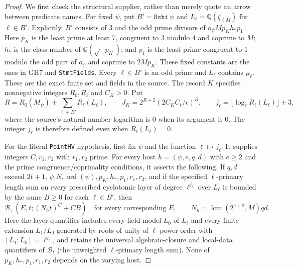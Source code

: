 \begin{proof}
We first check the structural supplier, rather than merely quote an
arrow between predicate names.  For fixed $\psi$, put
$B'=\mathtt{Bchi}\,\psi$ and
$L_\ell=\mathbb Q(\zeta_{\ell M})$ for $\ell\in B'$.
Explicitly, $B'$ consists of $3$ and the odd prime divisors of
$o_\psi M p_Kh_*p_1$.  Here $p_K$ is the least prime at least $7$,
congruent to $3$ modulo $4$ and coprime to $M$; $h_*$ is the class
number of $\mathbb Q(\sqrt{-p_K})$; and $p_1$ is the least prime
congruent to $1$ modulo the odd part of $o_\psi$ and coprime to
$2Mp_K$.  These fixed constants are the ones in GH7 and
\texttt{StmtFields}.
Every $\ell\in B'$ is an odd prime and $L_\ell$ contains $\mu_\ell$.
These are the exact finite set and fields in the source.
The record $K$ specifies nonnegative integers $R_0,R_\ell$ and $C_K>0$.
Put
\[
 R=R_0(M_\psi)+\sum_{\ell\in B'}R_\ell(L_\ell),\qquad
 J_K=2^{R+2}(2C_KC_t/\epsilon)^R,
 \qquad j_\ell=\lfloor\log_\ell R_\ell(L_\ell)\rfloor+3,
 \tag{VW.21}
\]
where the source's natural-number logarithm is $0$ when its argument is
$0$.  The integer $j_\ell$ is therefore defined even when
$R_\ell(L_\ell)=0$.

For the literal \texttt{PointHV} hypothesis, first fix $\psi$ and the
function $\ell\mapsto j_\ell$.  It supplies integers $C,r_1,r_2$ with
$r_1,r_2$ prime.  For every host
$h=(\psi,e,q,d)$ with $e\ge2$ and the prime congruence/coprimality
conditions, it asserts the following.  If $q,d$ exceed $2t+1$,
$\psi.N,\operatorname{ord}(\psi),p_K,h_*,p_1,r_1,r_2$, and if the
specified $\ell$-primary length sum on every prescribed cyclotomic
layer of degree $\ell^{j_\ell}$ over $L_\ell$ is bounded by the same
$B\ge0$ for each $\ell\in B'$, then
\[
       \mathcal B_+(E,t;(N_h t)^C+CB)
       \quad\text{for every corresponding }E,
 \qquad N_h=\operatorname{lcm}(2^{e+2},M)qd.
 \tag{VW.22}
\]
Here the layer quantifier includes every field model $L_0$ of $L_\ell$
and every finite extension $L_1/L_0$ generated by roots of unity of
$\ell$-power order with $[L_1:L_0]=\ell^{j_\ell}$, and retains the
universal algebraic-closure and local-data quantifiers of
$\mathcal B_\ell$ (the unweighted $\ell$-primary length sum).
None of $p_K,h_*,p_1,r_1,r_2$ depends on the varying host.


\end{proof}
